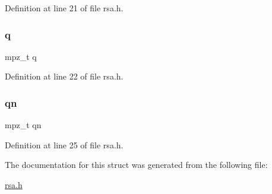 Definition at line 21 of file rsa.\+h.

\mbox{\label{structrsactx__t_aba94275944de73c899dbeb5f987c82cd}} 
\subsubsection{\texorpdfstring{q}{q}}
{\footnotesize\ttfamily mpz\+\_\+t q}



Definition at line 22 of file rsa.\+h.

\mbox{\label{structrsactx__t_ac9a71ce903d1d02bd0850eb017922d80}} 
\subsubsection{\texorpdfstring{qn}{qn}}
{\footnotesize\ttfamily mpz\+\_\+t qn}



Definition at line 25 of file rsa.\+h.



The documentation for this struct was generated from the following file\+:\begin{DoxyCompactItemize}
\item 
\hyperlink{rsa_8h}{rsa.\+h}\end{DoxyCompactItemize}
